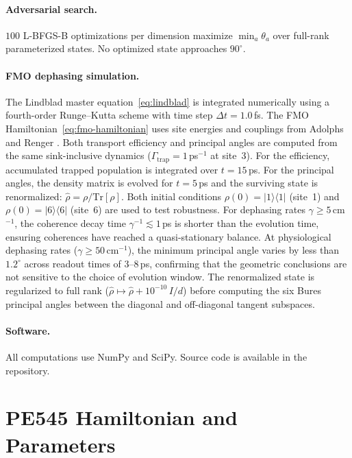\documentclass[12pt,a4paper]{article}
\theoremstyle{definition}
\theoremstyle{remark}
\begin{document}
\paragraph{Adversarial search.}
$100$ L-BFGS-B optimizations per dimension maximize $\min_a \theta_a$ over full-rank parameterized states. No optimized state approaches $90^\circ$.

\paragraph{FMO dephasing simulation.}
The Lindblad master equation~\eqref{eq:lindblad} is integrated numerically using a fourth-order Runge--Kutta scheme with time step $\Delta t = 1.0$\,fs. The FMO Hamiltonian~\eqref{eq:fmo-hamiltonian} uses site energies and couplings from Adolphs and Renger \cite{adolphs2006proteins}. Both transport efficiency and principal angles are computed from the same sink-inclusive dynamics ($\Gamma_{\mathrm{trap}} = 1$\,ps$^{-1}$ at site~3). For the efficiency, accumulated trapped population is integrated over $t = 15$\,ps. For the principal angles, the density matrix is evolved for $t = 5$\,ps and the surviving state is renormalized: $\hat{\rho} = \rho/\mathrm{Tr}[\rho]$. Both initial conditions $\rho(0) = |1\rangle\langle 1|$ (site~1) and $\rho(0) = |6\rangle\langle 6|$ (site~6) are used to test robustness. For dephasing rates $\gamma \geq 5$\,cm$^{-1}$, the coherence decay time $\gamma^{-1} \lesssim 1$\,ps is shorter than the evolution time, ensuring coherences have reached a quasi-stationary balance. At physiological dephasing rates ($\gamma \geq 50$\,cm$^{-1}$), the minimum principal angle varies by less than $1.2^\circ$ across readout times of 3--8\,ps, confirming that the geometric conclusions are not sensitive to the choice of evolution window. The renormalized state is regularized to full rank ($\hat{\rho} \mapsto \hat{\rho} + 10^{-10}\,I/d$) before computing the six Bures principal angles between the diagonal and off-diagonal tangent subspaces.

\paragraph{Software.}
All computations use NumPy and SciPy. Source code is available in the repository.

\section{PE545 Hamiltonian and Parameters}
\label{app:pe545}
\end{document}
